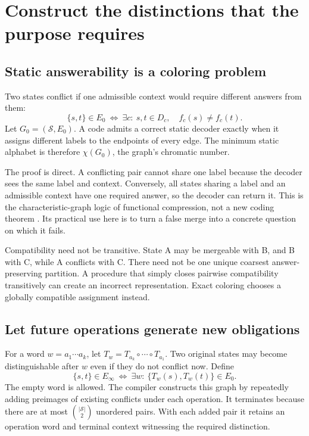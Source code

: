 \documentclass[11pt,letterpaper]{article}
\newcommand{\Sset}{\mathcal S}\newcommand{\Cset}{\mathcal C}
\theoremstyle{remark}\newtheorem{remark}{Remark}[section]
\begin{document}
\section{Construct the distinctions that the purpose requires}
\label{sec:conflict}
\subsection{Static answerability is a coloring problem}
Two states conflict if one admissible context would require different answers from them:
\begin{equation}
\{s,t\}\in E_0\ \Longleftrightarrow\ \exists c:\ s,t\in D_c,\quad f_c(s)\ne f_c(t).\label{eq:conflict}
\end{equation}
Let $G_0=(\Sset,E_0)$. A code admits a correct static decoder exactly when it assigns different labels to the endpoints of every edge. The minimum static alphabet is therefore $\chi(G_0)$, the graph's chromatic number.

The proof is direct. A conflicting pair cannot share one label because the decoder sees the same label and context. Conversely, all states sharing a label and an admissible context have one required answer, so the decoder can return it. This is the characteristic-graph logic of functional compression, not a new coding theorem \citep{orlitsky,doshi}. Its practical use here is to turn a false merge into a concrete question on which it fails.

Compatibility need not be transitive. State A may be mergeable with B, and B with C, while A conflicts with C. There need not be one unique coarsest answer-preserving partition. A procedure that simply closes pairwise compatibility transitively can create an incorrect representation. Exact coloring chooses a globally compatible assignment instead.

\subsection{Let future operations generate new obligations}
For a word $w=a_1\cdots a_k$, let $T_w=T_{a_k}\circ\cdots\circ T_{a_1}$. Two original states may become distinguishable after $w$ even if they do not conflict now. Define
\begin{equation}
\{s,t\}\in E_\infty\ \Longleftrightarrow\ \exists w:\ \{T_w(s),T_w(t)\}\in E_0.\label{eq:future}
\end{equation}
The empty word is allowed. The compiler constructs this graph by repeatedly adding preimages of existing conflicts under each operation. It terminates because there are at most $\binom{|\Sset|}{2}$ unordered pairs. With each added pair it retains an operation word and terminal context witnessing the required distinction.
\end{document}
